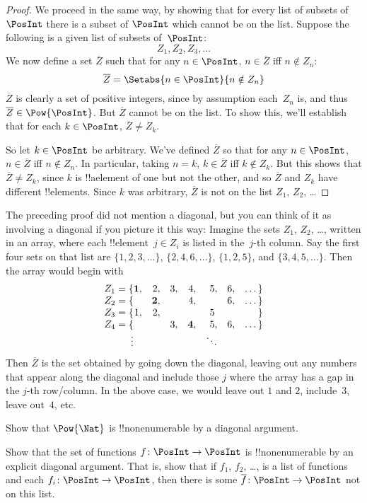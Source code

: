 \documentclass[../../../include/open-logic-section]{subfiles}
\begin{document}
\begin{proof}
We proceed in the same way, by showing that for every list of subsets
of~$\PosInt$ there is a subset of $\PosInt$ which cannot be on the list.
Suppose the following is a given list of subsets of~$\PosInt$:
\[
Z_{1}, Z_{2}, Z_{3}, \dots
\]
We now define a set $\overline{Z}$ such that for any $n \in \PosInt$,
$n \in \overline{Z}$ iff $n \notin Z_{n}$:
\[
\overline{Z} = \Setabs{n \in \PosInt}{n \notin Z_n}
\]
$\overline{Z}$ is clearly a set of positive integers, since by
assumption each~$Z_n$ is, and thus $\overline{Z} \in
\Pow{\PosInt}$. But $\overline{Z}$ cannot be on the list.  To show
this, we'll establish that for each $k \in \PosInt$, $\overline{Z} \neq
Z_k$. 

So let $k \in \PosInt$ be arbitrary. We've defined $\overline{Z}$ so
that for any $n \in \PosInt$, $n \in \overline{Z}$ iff $n \notin Z_n$.
In particular, taking $n=k$, $k \in \overline{Z}$ iff $k \notin Z_k$.
But this shows that $\overline{Z} \neq Z_k$, since $k$ is !!a{element}
of one but not the other, and so $\overline{Z}$ and $Z_k$ have
different !!{element}s. Since $k$ was arbitrary, $\overline{Z}$ is not
on the list $Z_1$, $Z_2$, \dots
\end{proof}

\begin{explain}
The preceding proof did not mention a diagonal, but you can think of
it as involving a diagonal if you picture it this way: Imagine the
sets $Z_1$, $Z_2$, \dots, written in an array, where each
!!{element}~$j \in Z_i$ is listed in the~$j$-th column. Say the first
four sets on that list are $\{1,2,3,\dots\}$, $\{2, 4, 6, \dots\}$,
$\{1,2,5\}$, and $\{3,4,5,\dots\}$. Then the array would begin with
\[
\begin{array}{r@{}rrrrrrr}
  Z_1 = \{ & \mathbf{1}, & 2, & 3, & 4, & 5, & 6, & \dots\}\\
  Z_2 = \{ &  & \mathbf{2}, &  & 4, &  & 6, & \dots\}\\
  Z_3 = \{ & 1, & 2, &  &  & 5\phantom{,} &  & \}\\
  Z_4 = \{ &  &  & 3, & \mathbf{4}, & 5, & 6, & \dots\}\\
  \vdots & & & & & \ddots
\end{array}
\]
Then $\overline{Z}$ is the set obtained by going down the diagonal,
leaving out any numbers that appear along the diagonal and include
those $j$ where the array has a gap in the $j$-th row/column. In the
above case, we would leave out $1$ and $2$, include~$3$, leave
out~$4$, etc.
\end{explain}

\begin{prob}
Show that $\Pow{\Nat}$ is !!{nonenumerable} by a diagonal argument.
\end{prob}

\begin{prob}
Show that the set of functions $f \colon \PosInt \to \PosInt$ is
!!{nonenumerable} by an explicit diagonal argument. That is, show that
if $f_1$, $f_2$, \dots, is a list of functions and each $f_i\colon
\PosInt \to \PosInt$, then there is some $\overline{f}\colon \PosInt \to
\PosInt$ not on this list.
\end{prob}
\end{document}

